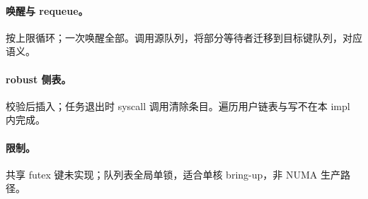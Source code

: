 \paragraph{唤醒与 requeue。}
按上限循环；一次唤醒全部。调用源队列，将部分等待者迁移到目标键队列，对应语义。

\paragraph{robust 侧表。}
校验后插入；任务退出时 syscall 调用清除条目。遍历用户链表与写不在本 impl 内完成。

\paragraph{限制。}
共享 futex 键未实现；队列表全局单锁，适合单核 bring-up，非 NUMA 生产路径。
